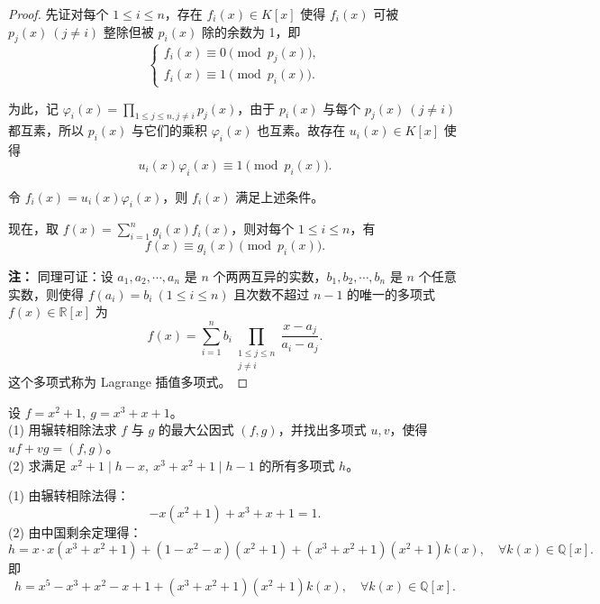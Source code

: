 \documentclass[lang=cn,12pt]{elegantbook}
\begin{document}
\begin{proof}
先证对每个 \( 1 \leq i \leq n \)，存在 \( f_i(x) \in K[x] \) 使得 \( f_i(x) \) 可被 \( p_j(x) \ (j \neq i) \) 整除但被 \( p_i(x) \) 除的余数为 1，即
\[
\begin{cases}
f_i(x) \equiv 0 \pmod{p_j(x)}, \\
f_i(x) \equiv 1 \pmod{p_i(x)}.
\end{cases}
\]

为此，记 \( \varphi_i(x) = \prod\limits_{1 \leq j \leq n, j \neq i} p_j(x) \)，由于 \( p_i(x) \) 与每个 \( p_j(x) \ (j \neq i) \) 都互素，所以 \( p_i(x) \) 与它们的乘积 \( \varphi_i(x) \) 也互素。故存在 \( u_i(x) \in K[x] \) 使得
\[
u_i(x) \varphi_i(x) \equiv 1 \pmod{p_i(x)}.
\]

令 \( f_i(x) = u_i(x) \varphi_i(x) \)，则 \( f_i(x) \) 满足上述条件。

现在，取 \( f(x) = \sum\limits_{i=1}^n g_i(x) f_i(x) \)，则对每个 \( 1 \leq i \leq n \)，有
\[
f(x) \equiv g_i(x) \pmod{p_i(x)}.
\]

\textbf{注：} 同理可证：设 \( a_1, a_2, \cdots, a_n \) 是 \( n \) 个两两互异的实数，\( b_1, b_2, \cdots, b_n \) 是 \( n \) 个任意实数，则使得 \( f(a_i) = b_i \ (1 \leq i \leq n) \) 且次数不超过 \( n-1 \) 的唯一的多项式 \( f(x) \in \mathbb{R}[x] \) 为
\[
f(x) = \sum_{i=1}^n b_i \prod_{\substack{1 \leq j \leq n \\ j \neq i}} \frac{x - a_j}{a_i - a_j}.
\]
这个多项式称为 Lagrange 插值多项式。
\end{proof}

\begin{example}
    设 \( f = x^2 + 1,\ g = x^3 + x + 1 \)。\\
    (1) 用辗转相除法求 \( f \) 与 \( g \) 的最大公因式 \( (f, g) \)，并找出多项式 \( u, v \)，使得 \( uf + vg = (f, g) \)。\\
    (2) 求满足 \( x^2 + 1 \mid h - x,\ x^3 + x^2 + 1 \mid h - 1 \) 的所有多项式 \( h \)。
\end{example}

\begin{solution}
    (1) 由辗转相除法得：
    \[
    -x(x^2 + 1) + x^3 + x + 1 = 1.
    \]
    (2) 由中国剩余定理得：
    \[
    h = x \cdot x(x^3 + x^2 + 1) + (1 - x^2 - x)(x^2 + 1) + (x^3 + x^2 + 1)(x^2 + 1)k(x),\quad \forall k(x) \in \mathbb{Q}[x].
    \]
    即
    \[
    h = x^5 - x^3 + x^2 - x + 1 + (x^3 + x^2 + 1)(x^2 + 1)k(x),\quad \forall k(x) \in \mathbb{Q}[x].
    \]
\end{solution}
\end{document}
